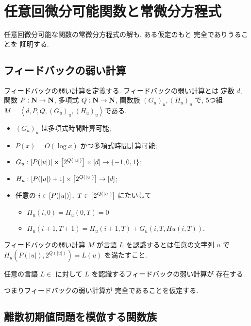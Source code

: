 \section{任意回微分可能関数と常微分方程式}

 任意回微分可能な関数の常微分方程式の解も, ある仮定のもと \PSPACE 完全でありうることを
 証明する.

  \subsection{フィードバックの弱い計算}
  フィードバックの弱い計算を定義する.
  フィードバックの弱い計算とは
  定数 $d$, 関数 $P : \mathbf N \to \mathbf N$, 多項式 $Q : \mathbf N \to \mathbf N$, 
  関数族 $(G_u)_u, (H_u)_u$ で, 
  5つ組 $M = \left< d, P, Q, (G_u)_u, (H_u)_u \right>$である.
 \begin{itemize}
  \item  $(G_u)_u$ は多項式時間計算可能;
  \item $P(x) = O(\log x)$ かつ多項式時間計算可能;
  \item $G_u: [P(|u|)] \times \left[ 2^{{Q(|u|)}} \right] \times [d] 
	\to \{-1, 0, 1\}$;
   \item $H_u: [P(|u|) + 1] \times 
	 \left[ 2^{{Q(|u|)}} \right] \to [d]$;
   \item 任意の $i \in \left[P(|u|) \right], 
	 \ T \in \left[ 2^{{Q(|u|)}} \right]$ にたいして 
	 \begin{itemize}
	  \item $H_u(i, 0) = H_u(0, T) = 0$
	  \item $H_u(i + 1, T + 1) = H_u(i+1, T) + G_u(i, T, Hu(i, T))$.
	 \end{itemize} 
 \end{itemize}

 フィードバックの弱い計算 $M$ が言語 $L$ を認識するとは任意の文字列 $u$ で
 $H_u(P(|u|), 2^{Q(|u|)}) = L(u)$ を満たすこと.

 \begin{hypothesis}
  \label{Hypothesis}
  任意の言語 $L \in$ \PSPACE に対して $L$ を認識するフィードバックの弱い計算が
  存在する.
 \end{hypothesis}

 つまりフィードバックの弱い計算が \PSPACE 完全であることを仮定する. 

 \subsection{離散初期値問題を模倣する関数族}

